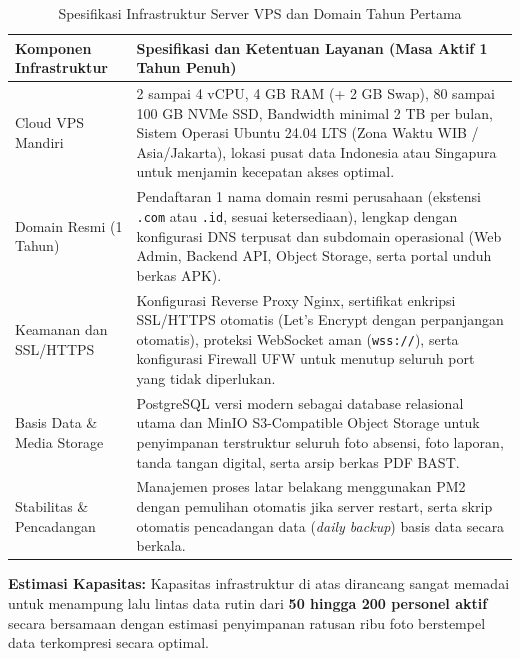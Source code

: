 \documentclass[11pt,a4paper]{article}
\begin{document}
\begin{table}[h!]
\centering
\renewcommand{\arraystretch}{1.25}
\begin{tabularx}{\textwidth}{@{}L{4.2cm}X@{}}
\toprule
\textbf{Komponen Infrastruktur} & \textbf{Spesifikasi dan Ketentuan Layanan (Masa Aktif 1 Tahun Penuh)} \\
\midrule
Cloud VPS Mandiri & 2 sampai 4 vCPU, 4 GB RAM (+ 2 GB Swap), 80 sampai 100 GB NVMe SSD, Bandwidth minimal 2 TB per bulan, Sistem Operasi Ubuntu 24.04 LTS (Zona Waktu WIB / Asia/Jakarta), lokasi pusat data Indonesia atau Singapura untuk menjamin kecepatan akses optimal. \\
\midrule
Domain Resmi (1 Tahun) & Pendaftaran 1 nama domain resmi perusahaan (ekstensi \texttt{.com} atau \texttt{.id}, sesuai ketersediaan), lengkap dengan konfigurasi DNS terpusat dan subdomain operasional (Web Admin, Backend API, Object Storage, serta portal unduh berkas APK). \\
\midrule
Keamanan dan SSL/HTTPS & Konfigurasi Reverse Proxy Nginx, sertifikat enkripsi SSL/HTTPS otomatis (Let's Encrypt dengan perpanjangan otomatis), proteksi WebSocket aman (\texttt{wss://}), serta konfigurasi Firewall UFW untuk menutup seluruh port yang tidak diperlukan. \\
\midrule
Basis Data \& Media Storage & PostgreSQL versi modern sebagai database relasional utama dan MinIO S3-Compatible Object Storage untuk penyimpanan terstruktur seluruh foto absensi, foto laporan, tanda tangan digital, serta arsip berkas PDF BAST. \\
\midrule
Stabilitas \& Pencadangan & Manajemen proses latar belakang menggunakan PM2 dengan pemulihan otomatis jika server restart, serta skrip otomatis pencadangan data (\textit{daily backup}) basis data secara berkala. \\
\bottomrule
\end{tabularx}
\caption{Spesifikasi Infrastruktur Server VPS dan Domain Tahun Pertama}
\end{table}

\textbf{Estimasi Kapasitas:} Kapasitas infrastruktur di atas dirancang sangat memadai untuk menampung lalu lintas data rutin dari \textbf{50 hingga 200 personel aktif} secara bersamaan dengan estimasi penyimpanan ratusan ribu foto berstempel data terkompresi secara optimal.

\end{document}

